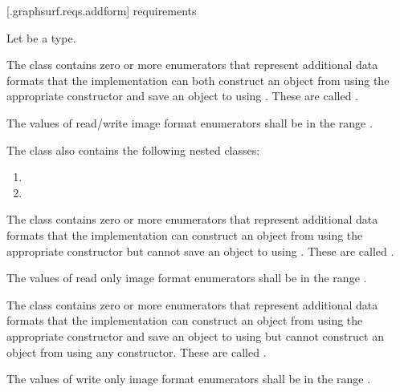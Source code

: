 
 [\iotwod.graphsurf.reqs.addform]{ requirements}

\pnum
Let  be a \graphicssurfacestemplparam type.

\pnum
The  class contains zero or more  enumerators that represent  additional data formats that the implementation can both construct an  object from using the appropriate constructor and save an  object to using . These are called .

\pnum
The values of read/write image format enumerators shall be in the range .

\pnum
The  class also contains the following nested classes:

\begin{enumerate}
\item {}
\item {}
\end{enumerate}

\pnum
The  class contains zero or more  enumerators that represent  additional data formats that the implementation can construct an  object from using the appropriate constructor but cannot save an  object to using . These are called .

\pnum
The values of read only image format enumerators shall be in the range .

\pnum
The  class contains zero or more  enumerators that represent  additional data formats that the implementation can construct an  object from using the appropriate constructor and save an  object to using  but cannot construct an  object from using any constructor. These are called .

\pnum
The values of write only image format enumerators shall be in the range .
